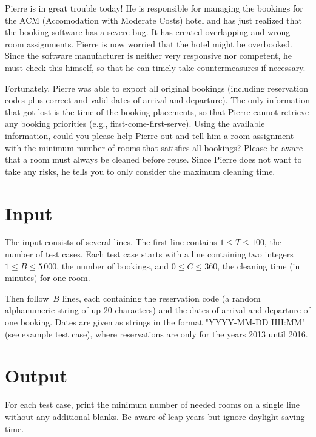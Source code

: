 
Pierre is in great trouble today! He is responsible for managing the bookings for the ACM (Accomodation with Moderate Costs) hotel and has just realized that the booking software has a severe bug. It has created overlapping and wrong room assignments. Pierre is now worried that the hotel might be overbooked. Since the software manufacturer is neither very responsive nor competent, he must check this himself, so that he can timely take countermeasures if necessary.

Fortunately, Pierre was able to export all original bookings (including reservation codes plus correct and valid dates of arrival and departure). The only information that got lost is the time of the booking placements, so that Pierre cannot retrieve any booking priorities (e.g., first-come-first-serve). Using the available information, could you please help Pierre out and tell him a room assignment with the minimum number of rooms that satisfies all bookings? Please be aware that a room must always be cleaned before reuse. Since Pierre does not want to take any risks, he tells you to only consider the maximum cleaning time.

\section*{Input}
The input consists of several lines. The first line contains $1\le T\le 100$, the number of test cases.
Each test case starts with a line containing two integers $1\le B\le 5\,000$, the number of bookings, and $0\le C\le 360$, the cleaning time (in minutes) for one room.

Then follow~$B$ lines, each containing the reservation code (a random alphanumeric string of up 20 characters) and the dates of arrival and departure of one booking. Dates are given as strings in the format "YYYY-MM-DD HH:MM" (see example test case), where reservations are only for the years 2013 until 2016. 

\section*{Output}
For each test case, print the minimum number of needed rooms on a single line without any additional blanks. Be aware of leap years but ignore daylight saving time.
